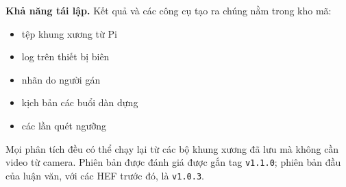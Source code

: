 \textbf{Khả năng tái lập.} Kết quả và các công cụ tạo ra chúng nằm trong kho mã:

\begin{itemize}
\tightlist
\item
  tệp khung xương từ Pi
\item
  log trên thiết bị biên
\item
  nhãn do người gán
\item
  kịch bản các buổi dàn dựng
\item
  các lần quét ngưỡng
\end{itemize}

Mọi phân tích đều có thể chạy lại từ các bộ khung xương đã lưu mà không cần video từ camera. Phiên bản được đánh giá được gắn tag \texttt{v1.1.0}; phiên bản đầu của luận văn, với các HEF trước đó, là \texttt{v1.0.3}.
